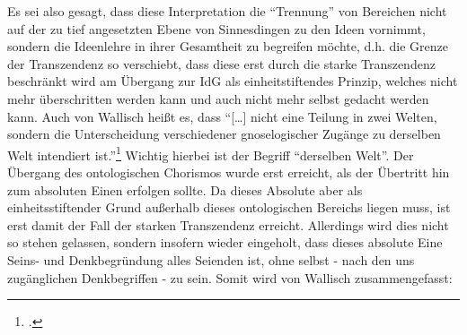 Es sei also gesagt, dass diese Interpretation die \enquote{Trennung} von Bereichen nicht auf der zu tief angesetzten Ebene von Sinnesdingen zu den Ideen vornimmt, sondern die Ideenlehre in ihrer Gesamtheit zu begreifen möchte, d.h. die Grenze der Transzendenz so verschiebt, dass diese erst durch die starke Transzendenz beschränkt wird am Übergang zur IdG als einheitstiftendes Prinzip, welches nicht mehr überschritten werden kann und auch nicht mehr selbst gedacht werden kann. 
Auch von Wallisch heißt es, dass \enquote{[\dots] nicht eine Teilung in zwei Welten, sondern die Unterscheidung verschiedener gnoselogischer Zugänge zu derselben Welt intendiert ist.}\footcite[vgl.][S. 15]{Wallisch}
Wichtig hierbei ist der Begriff \enquote{derselben Welt}. Der Übergang des ontologischen Chorismos wurde erst erreicht, als der Übertritt hin zum absoluten Einen erfolgen sollte. Da dieses Absolute aber als einheitsstiftender Grund außerhalb dieses ontologischen Bereichs liegen muss, ist erst damit der Fall der starken Transzendenz erreicht. Allerdings wird dies nicht so stehen gelassen, sondern insofern wieder eingeholt, dass dieses absolute Eine Seins- und Denkbegründung alles Seienden ist, ohne selbst - nach den uns zugänglichen Denkbegriffen - zu sein. Somit wird von Wallisch zusammengefasst:
